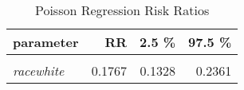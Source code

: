 \begin{table}

\caption{\label{tab:poisson_reg_RR}Poisson Regression Risk Ratios}
\centering
\begin{tabular}[t]{>{}lrrr}
\toprule
parameter & RR & 2.5 \% & 97.5 \%\\
\midrule
\em{\cellcolor{gray!6}{(Intercept)}} & \cellcolor{gray!6}{0.5220} & \cellcolor{gray!6}{0.4176} & \cellcolor{gray!6}{0.6425}\\
\em{racewhite} & 0.1767 & 0.1328 & 0.2361\\
\bottomrule
\end{tabular}
\end{table}
